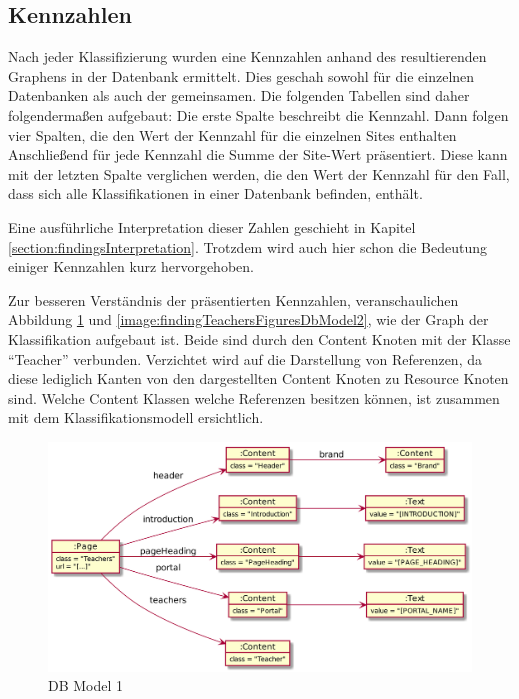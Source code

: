 \subsection{Kennzahlen}
    Nach jeder Klassifizierung wurden eine Kennzahlen anhand des
    resultierenden Graphens in der Datenbank ermittelt.
    Dies geschah sowohl für die einzelnen Datenbanken
    als auch der gemeinsamen.
    Die folgenden Tabellen sind daher folgendermaßen aufgebaut:
    Die erste Spalte beschreibt die Kennzahl.
    Dann folgen vier Spalten, die den Wert der Kennzahl für die einzelnen Sites enthalten
    Anschließend für jede Kennzahl die Summe der Site-Wert präsentiert.
    Diese kann mit der letzten Spalte verglichen werden,
    die den Wert der Kennzahl für den Fall,
    dass sich alle Klassifikationen in einer Datenbank befinden, enthält.

    Eine ausführliche Interpretation dieser Zahlen geschieht in Kapitel \ref{section:findingsInterpretation}.
    Trotzdem wird auch hier schon die Bedeutung einiger Kennzahlen kurz hervorgehoben.

    Zur besseren Verständnis der präsentierten Kennzahlen,
    veranschaulichen Abbildung
    \ref{image:findingTeachersFiguresDbModel1}
    und \ref{image:findingTeachersFiguresDbModel2},
    wie der Graph der Klassifikation aufgebaut ist.
    Beide sind durch den Content Knoten mit der Klasse "`Teacher"' verbunden.
    Verzichtet wird auf die Darstellung von Referenzen,
    da diese lediglich Kanten von den dargestellten Content Knoten
    zu Resource Knoten sind.
    Welche Content Klassen welche Referenzen besitzen können,
    ist zusammen mit dem Klassifikationsmodell ersichtlich.

    \begin{figure}[htb]
        \centering
        \includegraphics[scale=\imageScalingFactor]{../resources/findings/case-study-1/dbmodel/dbmodel1.png}
        \caption{DB Model 1}
        \label{image:findingTeachersFiguresDbModel1}
    \end{figure}

